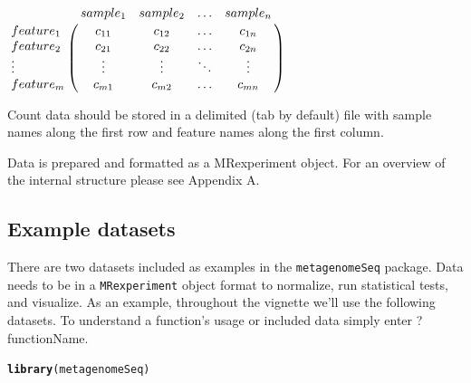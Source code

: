 \documentclass[a4paper,11pt]{article}\usepackage[]{graphicx}\usepackage[]{color}
\makeatletter
\newcommand{\hlstd}[1]{\textcolor[rgb]{0.345,0.345,0.345}{#1}}%
\newcommand{\hlkwd}[1]{\textcolor[rgb]{0.737,0.353,0.396}{\textbf{#1}}}%
\newenvironment{kframe}{%
 \def\at@end@of@kframe{}%
 \ifinner\ifhmode%
  \def\at@end@of@kframe{\end{minipage}}%
  \begin{minipage}{\columnwidth}%
 \fi\fi%
 \def\FrameCommand##1{\hskip\@totalleftmargin \hskip-\fboxsep
 \colorbox{shadecolor}{##1}\hskip-\fboxsep
     \hskip-\linewidth \hskip-\@totalleftmargin \hskip\columnwidth}%
 \MakeFramed {\advance\hsize-\width
   \@totalleftmargin\z@ \linewidth\hsize
   \@setminipage}}%
 {\par\unskip\endMakeFramed%
 \at@end@of@kframe}
\newenvironment{knitrout}{}{} %
\makeatother
\begin{document}
\begin{center}
$\bordermatrix{ &sample_1&sample_2&\ldots &sample_n\cr feature_1&c_{11} &  c_{12}  & \ldots & c_{1n}\cr feature_2& c_{21}  &  c_{22} & \ldots & c_{2n}\cr \vdots & \vdots & \vdots & \ddots & \vdots\cr feature_m & c_{m1}  &   c_{m2} &\ldots & c_{mn}}$
\end{center}

Count data should be stored in a delimited (tab by default) file with sample names
along the first row and feature names along the first column.

Data is prepared and formatted as a MRexperiment object. For an overview of the internal structure please see Appendix A.

\subsection{Example datasets}
There are two datasets included as examples in the \texttt{metagenomeSeq} package. Data needs to be in a \texttt{MRexperiment} object format to normalize, run statistical tests, and visualize. As an example, throughout the vignette we'll use the following datasets. 
To understand a function's usage or included data simply enter ?functionName.

\begin{knitrout}
\color{fgcolor}\begin{kframe}
\begin{alltt}
\hlkwd{library}\hlstd{(metagenomeSeq)}
\end{alltt}
\end{kframe}
\end{knitrout}
\end{document}
